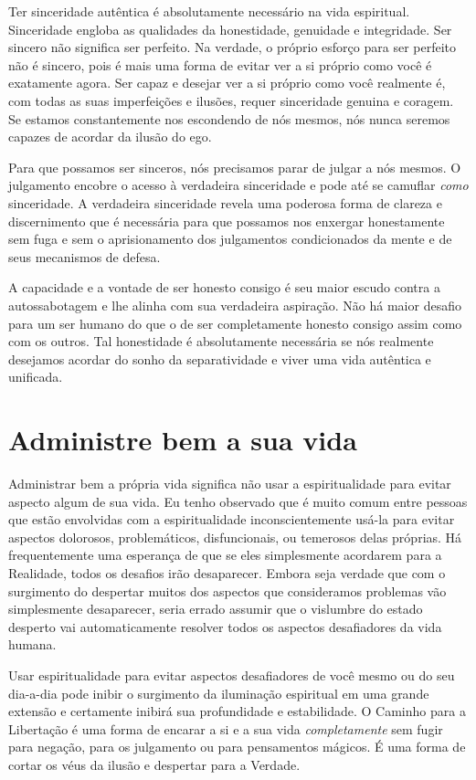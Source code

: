 Ter sinceridade autêntica é absolutamente necessário na vida espiritual. Sinceridade engloba as qualidades da honestidade, genuidade e integridade. Ser sincero não significa ser perfeito. Na verdade, o próprio esforço para ser perfeito não é sincero, pois é mais uma forma de evitar ver a si próprio como você é exatamente agora. Ser capaz e desejar ver a si próprio como você realmente é, com todas as suas imperfeições e ilusões, requer sinceridade genuina e coragem. Se estamos constantemente nos escondendo de nós mesmos, nós nunca seremos capazes de acordar da ilusão do ego.

Para que possamos ser sinceros, nós precisamos parar de julgar a nós mesmos. O julgamento encobre o acesso à verdadeira sinceridade e pode até se camuflar \emph{como} sinceridade. A verdadeira sinceridade revela uma poderosa forma de clareza e discernimento que é necessária para que possamos nos enxergar honestamente sem fuga e sem o aprisionamento dos julgamentos condicionados da mente e de seus mecanismos de defesa.

A capacidade e a vontade de ser honesto consigo é seu maior escudo contra a autossabotagem e lhe alinha com sua verdadeira aspiração. Não há maior desafio para um ser humano do que o de ser completamente honesto consigo assim como com os outros. Tal honestidade é absolutamente necessária se nós realmente desejamos acordar do sonho da separatividade e viver uma vida autêntica e unificada.

\section*{Administre bem a sua vida}

Administrar bem a própria vida significa não usar a espiritualidade para evitar aspecto algum de sua vida. Eu tenho observado que é muito comum entre pessoas que estão envolvidas com a espiritualidade inconscientemente usá-la para evitar aspectos dolorosos, problemáticos, disfuncionais, ou temerosos delas próprias. Há frequentemente uma esperança de que se eles simplesmente acordarem para a Realidade, todos os desafios irão desaparecer. Embora seja verdade que com o surgimento do despertar muitos dos aspectos que consideramos problemas vão simplesmente desaparecer, seria errado assumir que o vislumbre do estado desperto vai automaticamente resolver todos os aspectos desafiadores da vida humana.

Usar espiritualidade para evitar aspectos desafiadores de você mesmo ou do seu dia-a-dia pode inibir o surgimento da iluminação espiritual em uma grande extensão e certamente inibirá sua profundidade e estabilidade. O Caminho para a Libertação é uma forma de encarar a si e a sua vida \emph{completamente} sem fugir para negação, para os julgamento ou para pensamentos mágicos. É uma forma de cortar os véus da ilusão e despertar para a Verdade.

